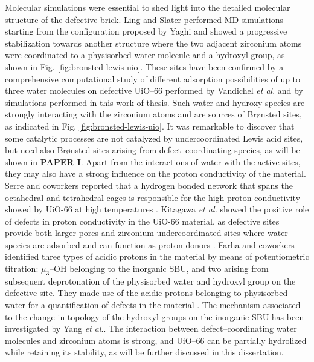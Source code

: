 \npar
Molecular simulations were essential to shed light into the detailed molecular structure of the defective brick. Ling and Slater \cite{ling2016dynamic} performed MD simulations starting from the configuration proposed by Yaghi and showed a progressive stabilization towards another structure where the two adjacent zirconium atoms were coordinated to a physisorbed water molecule and a hydroxyl group, as shown in Fig. \ref{fig:bronsted-lewis-uio}. These sites have been confirmed by a comprehensive computational study of different adsorption possibilities of up to three water molecules on defective UiO--66 performed by Vandichel \textit{et al}. \cite{vandichel2016water} and by simulations performed in this work of thesis.
Such water and hydroxy species are strongly interacting with the zirconium atoms and are sources of Br\o{}nsted sites, as indicated in Fig. \ref{fig:bronsted-lewis-uio}. It was remarkable to discover that some catalytic processes are not catalyzed by undercoordinated Lewis acid sites, but need also Br\o{}nsted sites arising from defect--coordinating species, as will be shown in \textbf{PAPER I}. Apart from the interactions of water with the active sites, they may also have a strong influence on the proton conductivity of the material. Serre and coworkers reported that a hydrogen bonded network that spans the octahedral and tetrahedral cages is responsible for the high proton conductivity showed by UiO-66 at high temperatures \cite{borges2016proton}. Kitagawa \textit{et al.} showed the positive role of defects in proton conductivity in the UiO-66 material, as defective sites provide both larger pores and zirconium undercoordinated sites where water species are adsorbed and can function as proton donors \cite{taylor2015defect}. Farha and coworkers identified three types of acidic protons in the material by means of potentiometric titration: $\mu_{3}$--OH belonging to the inorganic SBU, and two arising from subsequent deprotonation of the physisorbed water and hydroxyl group on the defective site. They made use of the acidic protons belonging to physisorbed water for a quantification of defects in the material \cite{klet2016evaluation}. The mechanism associated to the change in topology of the hydroxyl groups on the inorganic SBU has been investigated by Yang \textit{et al}.\cite{yang2016tuning}. The interaction between defect--coordinating water molecules and zirconium atoms is strong, and UiO--66 can be partially hydrolized\cite{decoste2013stability} while retaining its stability, as will be further discussed in this dissertation.
\npar
